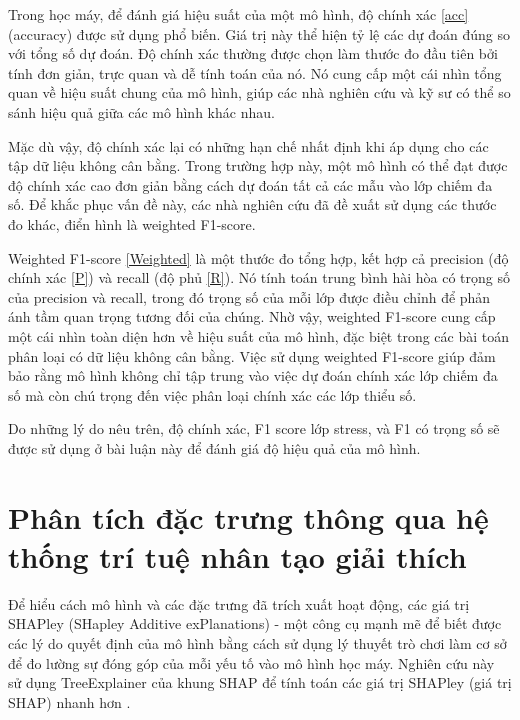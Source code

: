 Trong học máy, để đánh giá hiệu suất của một mô hình, độ chính xác \eqref{acc} (accuracy) được sử dụng phổ biến. Giá trị này thể hiện tỷ lệ các dự đoán đúng so với tổng số dự đoán. Độ chính xác thường được chọn làm thước đo đầu tiên bởi tính đơn giản, trực quan và dễ tính toán của nó. Nó cung cấp một cái nhìn tổng quan về hiệu suất chung của mô hình, giúp các nhà nghiên cứu và kỹ sư có thể so sánh hiệu quả giữa các mô hình khác nhau.

Mặc dù vậy, độ chính xác lại có những hạn chế nhất định khi áp dụng cho các tập dữ liệu không cân bằng. Trong trường hợp này, một mô hình có thể đạt được độ chính xác cao đơn giản bằng cách dự đoán tất cả các mẫu vào lớp chiếm đa số. Để khắc phục vấn đề này, các nhà nghiên cứu đã đề xuất sử dụng các thước đo khác, điển hình là weighted F1-score.

Weighted F1-score \eqref{Weighted} là một thước đo tổng hợp, kết hợp cả precision (độ chính xác \eqref{P}) và recall (độ phủ \eqref{R}). Nó tính toán trung bình hài hòa có trọng số của precision và recall, trong đó trọng số của mỗi lớp được điều chỉnh để phản ánh tầm quan trọng tương đối của chúng. Nhờ vậy, weighted F1-score cung cấp một cái nhìn toàn diện hơn về hiệu suất của mô hình, đặc biệt trong các bài toán phân loại có dữ liệu không cân bằng. Việc sử dụng weighted F1-score giúp đảm bảo rằng mô hình không chỉ tập trung vào việc dự đoán chính xác lớp chiếm đa số mà còn chú trọng đến việc phân loại chính xác các lớp thiểu số.

Do những lý do nêu trên, độ chính xác, F1 score lớp stress, và F1 có trọng số sẽ được sử dụng ở bài luận này để đánh giá độ hiệu quả của mô hình.

\section{Phân tích đặc trưng thông qua hệ thống trí tuệ nhân tạo giải thích}
Để hiểu cách mô hình và các đặc trưng đã trích xuất hoạt động, các giá trị SHAPley (SHapley Additive exPlanations) - một công cụ mạnh mẽ để biết được các lý do quyết định của mô hình bằng cách sử dụng lý thuyết trò chơi làm cơ sở để đo lường sự đóng góp của mỗi yếu tố vào mô hình học máy. Nghiên cứu này sử dụng TreeExplainer của khung SHAP để tính toán các giá trị SHAPley (giá trị SHAP) nhanh hơn \cite{tree_explainer} .

